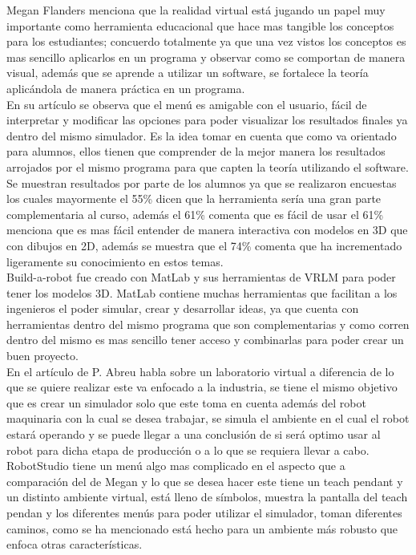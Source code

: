Megan Flanders \cite{flanders-2015} menciona que la realidad virtual está jugando un papel muy importante como herramienta educacional que hace mas tangible los conceptos para los estudiantes; concuerdo totalmente ya que una vez vistos los conceptos es mas sencillo aplicarlos en un programa y observar como se comportan de manera visual, además que se aprende a utilizar un software, se fortalece la teoría aplicándola de manera práctica en un programa.\\
En su artículo se observa que el menú es amigable con el usuario, fácil de interpretar y modificar las opciones para poder visualizar los resultados finales ya dentro del mismo simulador. Es la idea tomar en cuenta que como va orientado para alumnos, ellos tienen que comprender de la mejor manera los resultados arrojados por el mismo programa para que capten la teoría utilizando el software.\\
Se muestran resultados por parte de los alumnos ya que se realizaron encuestas los cuales mayormente el 55\% dicen que la herramienta sería una gran parte complementaria al curso, además el 61\% comenta que es fácil de usar el 61\% menciona que es mas fácil entender de manera interactiva con modelos en 3D que con dibujos en 2D, además se muestra que el 74\% comenta que ha incrementado ligeramente su conocimiento en estos temas.\\
Build-a-robot fue creado con MatLab y sus herramientas de VRLM para poder tener los modelos 3D. MatLab contiene muchas herramientas que facilitan a los ingenieros el poder simular, crear y desarrollar ideas, ya que cuenta con herramientas dentro del mismo programa que son complementarias y como corren dentro del mismo es mas sencillo tener acceso y combinarlas para poder crear un buen proyecto.\\

En el artículo de P. Abreu \cite{abreu-2015} habla sobre un laboratorio virtual a diferencia de lo que se quiere realizar este va enfocado a la industria, se tiene el mismo objetivo que es crear un simulador solo que este toma en cuenta además del robot maquinaria con la cual se desea trabajar, se simula el ambiente en el cual el robot estará operando y se puede llegar a una conclusión de si será optimo usar al robot para dicha etapa de producción o a lo que se requiera llevar a cabo. RobotStudio tiene un menú algo mas complicado en el aspecto que a comparación del de Megan y lo que se desea hacer este tiene un teach pendant y un distinto ambiente virtual, está lleno de símbolos, muestra la pantalla del teach pendan y los diferentes menús para poder utilizar el simulador, toman diferentes caminos, como se ha mencionado está hecho para un ambiente más robusto que enfoca otras características.
